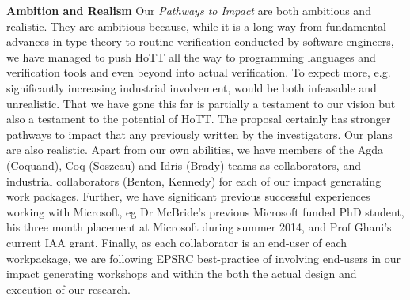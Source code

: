 \documentclass[a4paper,11pt]{article}
\begin{document}
{\bf Ambition and Realism} Our {\em Pathways to Impact} are both ambitious
and realistic. They are ambitious because, while it is a long way from
fundamental advances in type theory to routine verification conducted
by software engineers, we have managed to push HoTT all the way to
programming languages and verification tools and even beyond into
actual verification. To expect more, e.g. significantly increasing
industrial involvement, would be both infeasable and unrealistic. That
we have gone this far is partially a testament to our vision
but also a testament to the potential of HoTT. The proposal certainly
has stronger pathways to impact that any previously written by the
investigators. Our plans are also realistic. Apart from our own
abilities, we have members of the Agda (Coquand), Coq (Soszeau) and
Idris (Brady) teams as collaborators, and industrial collaborators
(Benton, Kennedy) for each of our impact generating work
packages. Further, we have significant previous successful experiences
working with Microsoft, eg Dr McBride's previous Microsoft funded PhD
student, his three month placement at Microsoft during summer 2014,
and Prof Ghani's current IAA grant. Finally, as each collaborator is
an end-user of each workpackage, we are following EPSRC best-practice of
involving end-users in our impact generating workshops and within the
both the actual design and execution of our research.






\end{document}
